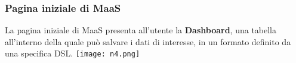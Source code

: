 \begin{frame}
\frametitle{Pagina iniziale di MaaS}
      La pagina iniziale di MaaS presenta all'utente la \textbf{Dashboard}, una tabella all'interno della quale può salvare i dati di interesse, in un formato definito da una specifica DSL.
      \texttt{[image: n4.png]}\\
\end{frame}


